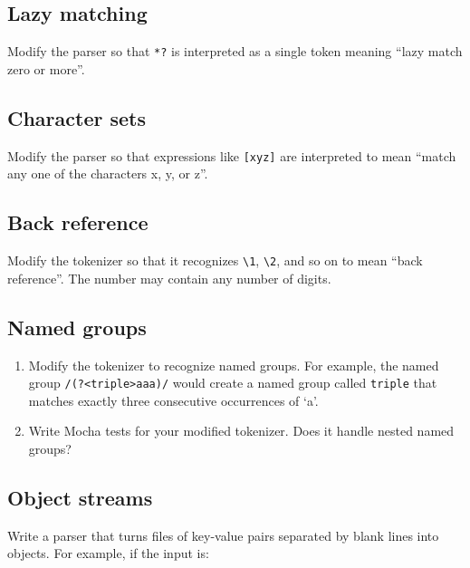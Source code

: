 \documentclass[krantzl]{krantz}
\begin{document}
\subsection*{Lazy matching}


Modify the parser so that \texttt{*?} is interpreted as a single token
meaning “lazy match zero or more”.

\subsection*{Character sets}


Modify the parser so that expressions like \texttt{[xyz]} are interpreted to mean
“match any one of the characters x, y, or z”.

\subsection*{Back reference}


Modify the tokenizer so that it recognizes \texttt{{\textbackslash}1}, \texttt{{\textbackslash}2}, and so on to mean “back reference”.
The number may contain any number of digits.

\subsection*{Named groups}

\begin{enumerate}

\item 

Modify the tokenizer to recognize named groups.
    For example, the named group \texttt{/(?<triple>aaa)/}
    would create a named group called \texttt{triple} that matches exactly three consecutive occurrences of ‘a’.



\item 

Write Mocha tests for your modified tokenizer.
    Does it handle nested named groups?



\end{enumerate}

\subsection*{Object streams}


Write a parser that turns files of key-value pairs separated by blank lines into objects.
For example, if the input is:
\end{document}
